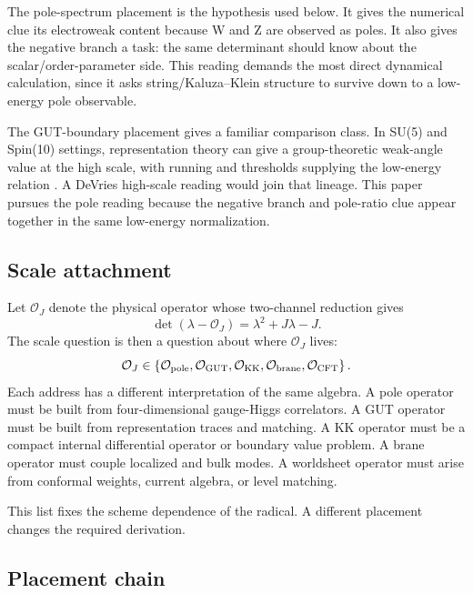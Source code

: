 The pole-spectrum placement is the hypothesis used below.  It gives the numerical clue its electroweak content because W and Z are observed as poles.  It also gives the negative branch a task: the same determinant should know about the scalar/order-parameter side.  This reading demands the most direct dynamical calculation, since it asks string/Kaluza--Klein structure to survive down to a low-energy pole observable.

The GUT-boundary placement gives a familiar comparison class.  In SU(5) and Spin(10) settings, representation theory can give a group-theoretic weak-angle value at the high scale, with running and thresholds supplying the low-energy relation \cite{Britto2021}.  A DeVries high-scale reading would join that lineage.  This paper pursues the pole reading because the negative branch and pole-ratio clue appear together in the same low-energy normalization.

\subsection{Scale attachment}

Let \(\mathcal O_J\) denote the physical operator whose two-channel reduction gives
\begin{equation}
  \det(\lambda-\mathcal O_J)=\lambda^2+J\lambda-J.
  \label{eq:operator-placement}
\end{equation}
The scale question is then a question about where \(\mathcal O_J\) lives:
\begin{equation}
  \mathcal O_J
  \in
  \left\{
  \mathcal O_{\rm pole},
  \mathcal O_{\rm GUT},
  \mathcal O_{\rm KK},
  \mathcal O_{\rm brane},
  \mathcal O_{\rm CFT}
  \right\}.
  \label{eq:operator-addresses}
\end{equation}
Each address has a different interpretation of the same algebra.  A pole operator must be built from four-dimensional gauge-Higgs correlators.  A GUT operator must be built from representation traces and matching.  A KK operator must be a compact internal differential operator or boundary value problem.  A brane operator must couple localized and bulk modes.  A worldsheet operator must arise from conformal weights, current algebra, or level matching.

This list fixes the scheme dependence of the radical.  A different placement changes the required derivation.

\subsection{Placement chain}
\label{sec:placement-chain}

